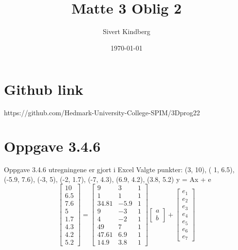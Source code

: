 \documentclass[a4paper,norsk]{article}
\title{Matte 3 Oblig 2}
\date{\today}
\author{Sivert Kindberg}
\begin{document}
\maketitle
\tableofcontents
\newpage
 \section{Github link}
https://github.com/Hedmark-University-College-SPIM/3Dprog22

\section{Oppgave 3.4.6}
Oppgave 3.4.6
utregningene er gjort i Excel \newline
Valgte punkter: (3, 10), ( 1, 6.5), (-5.9, 7.6), (-3, 5), (-2, 1.7), (-7, 4.3), (6.9, 4.2), (3.8, 5.2)\newline
\newline
y = Ax + e 
\newline
\begin{equation*} 
\begin{bmatrix}10 \\ 6.5\\7.6\\5\\1.7\\4.3\\4.2\\5.2\end{bmatrix}
=\begin{bmatrix}9 & 3 & 1 \\ 1 & 1 & 1 \\34.81 & -5.9 & 1 \\ 9 & -3 & 1 \\4 & -2 & 1 \\49& 7 & 1 \\47.61 & 6.9 & 1 \\ 14.9 & 3.8 & 1\end{bmatrix}\begin{bmatrix}a\\b\end{bmatrix}
+ \begin{bmatrix} e_1 \\ e_2 \\ e_3 \\ e_4 \\ e_5 \\ e_6 \\ e_7\end{bmatrix}
\end{equation*}
\end{document}
